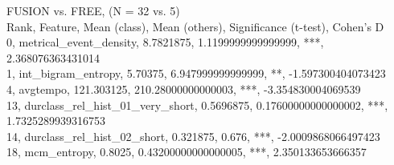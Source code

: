 FUSION vs. FREE, (N = 32 vs. 5)\\
Rank, Feature, Mean (class), Mean (others), Significance (t-test), Cohen's D\\
0, metrical_event_density, 8.7821875, 1.1199999999999999, ***, 2.368076363431014\\
1, int_bigram_entropy, 5.70375, 6.947999999999999, **, -1.597300404073423\\
4, avgtempo, 121.303125, 210.28000000000003, ***, -3.354830004069539\\
13, durclass_rel_hist_01_very_short, 0.5696875, 0.17600000000000002, ***, 1.7325289939316753\\
14, durclass_rel_hist_02_short, 0.321875, 0.676, ***, -2.0009868066497423\\
18, mcm_entropy, 0.8025, 0.43200000000000005, ***, 2.350133653666357\\
